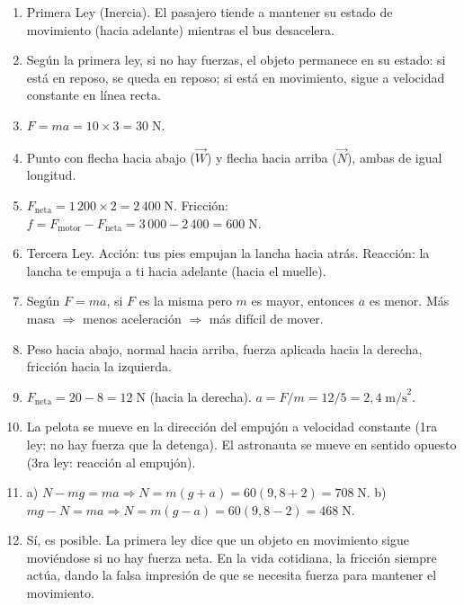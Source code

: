 \documentclass[12pt, a4paper]{article}
\begin{document}
\begin{enumerate}[leftmargin=*, label=\textbf{\arabic*.}]
  \item Primera Ley (Inercia). El pasajero tiende a mantener su estado de movimiento (hacia adelante) mientras el bus desacelera.

  \item Según la primera ley, si no hay fuerzas, el objeto permanece en su estado: si está en reposo, se queda en reposo; si está en movimiento, sigue a velocidad constante en línea recta.

  \item $F = ma = 10 \times 3 = 30\;\text{N}$.

  \item Punto con flecha hacia abajo ($\vec{W}$) y flecha hacia arriba ($\vec{N}$), ambas de igual longitud.

  \item $F_{\text{neta}} = 1\,200 \times 2 = 2\,400\;\text{N}$. Fricción: $f = F_{\text{motor}} - F_{\text{neta}} = 3\,000 - 2\,400 = 600\;\text{N}$.

  \item Tercera Ley. Acción: tus pies empujan la lancha hacia atrás. Reacción: la lancha te empuja a ti hacia adelante (hacia el muelle).

  \item Según $F = ma$, si $F$ es la misma pero $m$ es mayor, entonces $a$ es menor. Más masa $\Rightarrow$ menos aceleración $\Rightarrow$ más difícil de mover.

  \item Peso hacia abajo, normal hacia arriba, fuerza aplicada hacia la derecha, fricción hacia la izquierda.

  \item $F_{\text{neta}} = 20 - 8 = 12\;\text{N}$ (hacia la derecha). $a = F/m = 12/5 = 2{,}4\;\text{m/s}^2$.

  \item La pelota se mueve en la dirección del empujón a velocidad constante (1ra ley: no hay fuerza que la detenga). El astronauta se mueve en sentido opuesto (3ra ley: reacción al empujón).

  \item a) $N - mg = ma \Rightarrow N = m(g + a) = 60(9{,}8 + 2) = 708\;\text{N}$. b) $mg - N = ma \Rightarrow N = m(g - a) = 60(9{,}8 - 2) = 468\;\text{N}$.

  \item Sí, es posible. La primera ley dice que un objeto en movimiento sigue moviéndose si no hay fuerza neta. En la vida cotidiana, la fricción siempre actúa, dando la falsa impresión de que se necesita fuerza para mantener el movimiento.
\end{enumerate}
\end{document}
